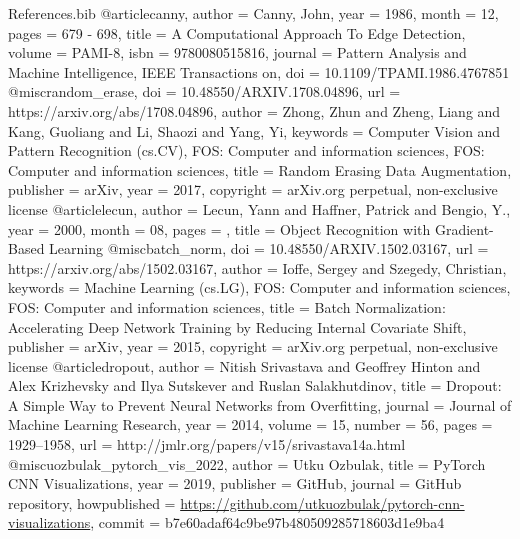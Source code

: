 \documentclass[a4paper,12pt,sort&compress]{article}
\begin{document}
\begin{filecontents}{References.bib}
    @article{canny,
        author = {Canny, John},
        year = {1986},
        month = {12},
        pages = {679 - 698},
        title = {A Computational Approach To Edge Detection},
        volume = {PAMI-8},
        isbn = {9780080515816},
        journal = {Pattern Analysis and Machine Intelligence, IEEE Transactions on},
        doi = {10.1109/TPAMI.1986.4767851}
        }
    @misc{random_erase,
        doi = {10.48550/ARXIV.1708.04896},
        url = {https://arxiv.org/abs/1708.04896},
        author = {Zhong, Zhun and Zheng, Liang and Kang, Guoliang and Li, Shaozi and Yang, Yi},
        keywords = {Computer Vision and Pattern Recognition (cs.CV), FOS: Computer and information sciences, FOS: Computer and information sciences},
        title = {Random Erasing Data Augmentation},
        publisher = {arXiv},
        year = {2017},
        copyright = {arXiv.org perpetual, non-exclusive license}
        }
    @article{lecun,
        author = {Lecun, Yann and Haffner, Patrick and Bengio, Y.},
        year = {2000},
        month = {08},
        pages = {},
        title = {Object Recognition with Gradient-Based Learning}
        }
    @misc{batch_norm,
        doi = {10.48550/ARXIV.1502.03167},
        url = {https://arxiv.org/abs/1502.03167},
        author = {Ioffe, Sergey and Szegedy, Christian},
        keywords = {Machine Learning (cs.LG), FOS: Computer and information sciences, FOS: Computer and information sciences},
        title = {Batch Normalization: Accelerating Deep Network Training by Reducing Internal Covariate Shift},
        publisher = {arXiv},
        year = {2015},
        copyright = {arXiv.org perpetual, non-exclusive license}
      }
    @article{dropout,
      author  = {Nitish Srivastava and Geoffrey Hinton and Alex Krizhevsky and Ilya Sutskever and Ruslan Salakhutdinov},
      title   = {Dropout: A Simple Way to Prevent Neural Networks from Overfitting},
      journal = {Journal of Machine Learning Research},
      year    = {2014},
      volume  = {15},
      number  = {56},
      pages   = {1929--1958},
      url     = {http://jmlr.org/papers/v15/srivastava14a.html}
    }
    @misc{uozbulak_pytorch_vis_2022,
        author = {Utku Ozbulak},
        title = {PyTorch CNN Visualizations},
        year = {2019},
        publisher = {GitHub},
        journal = {GitHub repository},
        howpublished = {\url{https://github.com/utkuozbulak/pytorch-cnn-visualizations}},
        commit = {b7e60adaf64c9be97b480509285718603d1e9ba4}
    }
      



\end{filecontents}






\newpage
\end{document}
